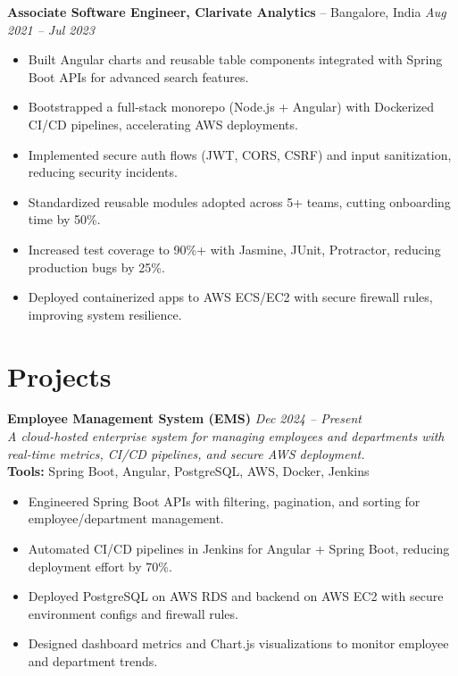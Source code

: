 \documentclass[10pt, letterpaper]{article}
\newenvironment{highlights}{\begin{itemize}[topsep=0.05cm,parsep=0.05cm,partopsep=0pt,itemsep=2pt,leftmargin=10pt]}{\end{itemize}}
\begin{document}
\textbf{Associate Software Engineer, Clarivate Analytics} -- Bangalore, India \hfill \textit{Aug 2021 -- Jul 2023} \\
\begin{highlights}
    \item Built Angular charts and reusable table components integrated with Spring Boot APIs for advanced search features.
    \item Bootstrapped a full-stack monorepo (Node.js + Angular) with Dockerized CI/CD pipelines, accelerating AWS deployments.
    \item Implemented secure auth flows (JWT, CORS, CSRF) and input sanitization, reducing security incidents.
    \item Standardized reusable modules adopted across 5+ teams, cutting onboarding time by 50\%.
    \item Increased test coverage to 90\%+ with Jasmine, JUnit, Protractor, reducing production bugs by 25\%.
    \item Deployed containerized apps to AWS ECS/EC2 with secure firewall rules, improving system resilience.
\end{highlights}

\section{Projects}

\textbf{Employee Management System (EMS)} \hfill \textit{Dec 2024 – Present} \\
\textit{A cloud-hosted enterprise system for managing employees and departments with real-time metrics, CI/CD pipelines, and secure AWS deployment.} \\
\textbf{Tools: } Spring Boot, Angular, PostgreSQL, AWS, Docker, Jenkins \\
\begin{highlights}
    \item Engineered Spring Boot APIs with filtering, pagination, and sorting for employee/department management.
    \item Automated CI/CD pipelines in Jenkins for Angular + Spring Boot, reducing deployment effort by 70\%.
    \item Deployed PostgreSQL on AWS RDS and backend on AWS EC2 with secure environment configs and firewall rules.
    \item Designed dashboard metrics and Chart.js visualizations to monitor employee and department trends.
\end{highlights}
\vspace{0.3cm}
\end{document}
